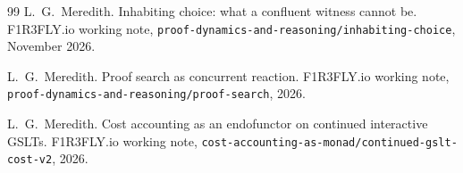 \documentclass[11pt,a4paper]{article}
\theoremstyle{plain}
\theoremstyle{definition}
\theoremstyle{remark}
\begin{document}
\begin{thebibliography}{99}
L.~G.~Meredith.
\newblock Inhabiting choice: what a confluent witness cannot be.
\newblock F1R3FLY.io working note,
\texttt{proof-dynamics-and-reasoning/inhabiting-choice}, November 2026.

L.~G.~Meredith.
\newblock Proof search as concurrent reaction.
\newblock F1R3FLY.io working note,
\texttt{proof-dynamics-and-reasoning/proof-search}, 2026.

L.~G.~Meredith.
\newblock Cost accounting as an endofunctor on continued interactive GSLTs.
\newblock F1R3FLY.io working note,
\texttt{cost-accounting-as-monad/continued-gslt-cost-v2}, 2026.

\end{thebibliography}
\end{document}

